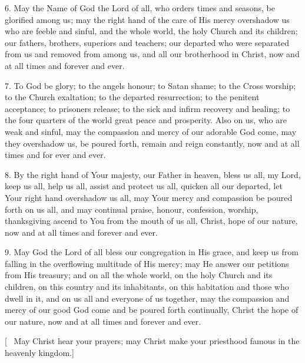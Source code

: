 \documentclass[12pt,twoside,a5paper]{article}
\begin{document}
6. May the Name of God the Lord of all, who orders times and seasons, be glorified among us; may the right hand of the care of His mercy overshadow us who are feeble and sinful, and the whole world, the holy Church and its children; our fathers, brothers, superiors and teachers; our departed who were separated from us and removed from among us, and all our brotherhood in Christ, now and at all times and forever and ever.

7. To God be glory; to the angels honour; to Satan shame; to the Cross worship; to the Church exaltation; to the departed resurrection; to the penitent acceptance; to prisoners release; to the sick and infirm recovery and healing; to the four quarters of the world great peace and prosperity. Also on us, who are weak and sinful, may the compassion and mercy of our adorable God come, may they overshadow us, be poured forth, remain and reign constantly, now and at all times and for ever and ever.


8. By the right hand of Your majesty, our Father in heaven, bless us all, my Lord, keep us all, help us all, assist and protect us all, quicken all our departed, let Your right hand overshadow us all, may Your mercy and compassion be poured forth on us all, and may continual praise, honour, confession, worship, thanksgiving ascend to You from the mouth of us all, Christ, hope of our nature, now and at all times and forever and ever.

9.  May God the Lord of all bless our congregation in His grace, and keep us from falling in the overflowing multitude of His mercy; may He answer our petitions from His treasury; and on all the whole world, on the holy Church and its children, on this country and its inhabitants, on this habitation and those who dwell in it, and on us all and everyone of us together, may the compassion and mercy of our good God come and be poured forth continually, Christ the hope of our nature, now and at all times and forever and ever.

[ \rr~May Christ hear your prayers; may Christ make your priesthood famous in the heavenly kingdom.]

\end{document}
